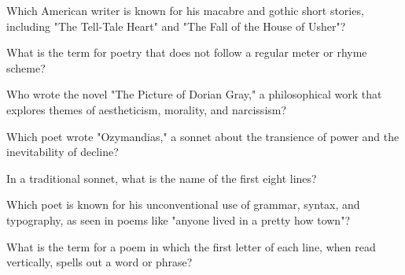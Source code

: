 \documentclass[12pt,a4paper]{book}
\begin{document}
\begin{enhancedmcq}[Question 4]{Which American writer is known for his macabre and gothic short stories, including "The Tell-Tale Heart" and "The Fall of the House of Usher"?}
\end{enhancedmcq}

\begin{enhancedmcq}[Question 5]{What is the term for poetry that does not follow a regular meter or rhyme scheme?}
\end{enhancedmcq}

\begin{enhancedmcq}[Question 6]{Who wrote the novel "The Picture of Dorian Gray," a philosophical work that explores themes of aestheticism, morality, and narcissism?}
\end{enhancedmcq}

\begin{enhancedmcq}[Question 7]{Which poet wrote "Ozymandias," a sonnet about the transience of power and the inevitability of decline?}
\end{enhancedmcq}

\begin{enhancedmcq}[Question 8]{In a traditional sonnet, what is the name of the first eight lines?}
\end{enhancedmcq}

\begin{enhancedmcq}[Question 9]{Which poet is known for his unconventional use of grammar, syntax, and typography, as seen in poems like "anyone lived in a pretty how town"?}
\end{enhancedmcq}

\begin{enhancedmcq}[Question 10]{What is the term for a poem in which the first letter of each line, when read vertically, spells out a word or phrase?}
\end{enhancedmcq}
\end{document}
